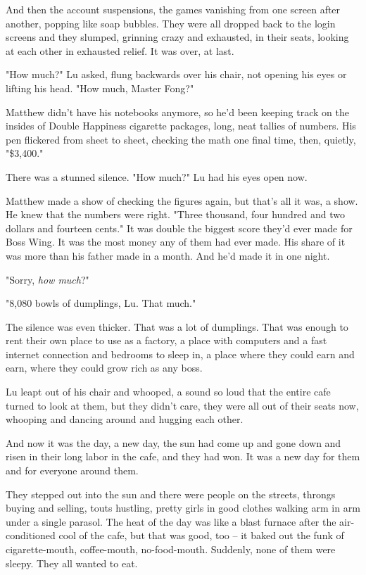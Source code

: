 And then the account suspensions, the games vanishing from one
screen after another, popping like soap bubbles. They were all
dropped back to the login screens and they slumped, grinning crazy
and exhausted, in their seats, looking at each other in exhausted
relief. It was over, at last.

"How much?" Lu asked, flung backwards over his chair, not opening
his eyes or lifting his head. "How much, Master Fong?"

Matthew didn't have his notebooks anymore, so he'd been keeping
track on the insides of Double Happiness cigarette packages, long,
neat tallies of numbers. His pen flickered from sheet to sheet,
checking the math one final time, then, quietly, "\$3,400."

There was a stunned silence. "How much?" Lu had his eyes open now.

Matthew made a show of checking the figures again, but that's all
it was, a show. He knew that the numbers were right. "Three
thousand, four hundred and two dollars and fourteen cents." It was
double the biggest score they'd ever made for Boss Wing. It was the
most money any of them had ever made. His share of it was more than
his father made in a month. And he'd made it in one night.

"Sorry, \emph{how much}?"

"8,080 bowls of dumplings, Lu. That much."

The silence was even thicker. That was a lot of dumplings. That was
enough to rent their own place to use as a factory, a place with
computers and a fast internet connection and bedrooms to sleep in,
a place where they could earn and earn, where they could grow rich
as any boss.

Lu leapt out of his chair and whooped, a sound so loud that the
entire cafe turned to look at them, but they didn't care, they were
all out of their seats now, whooping and dancing around and hugging
each other.

And now it was the day, a new day, the sun had come up and gone
down and risen in their long labor in the cafe, and they had won.
It was a new day for them and for everyone around them.

They stepped out into the sun and there were people on the streets,
throngs buying and selling, touts hustling, pretty girls in good
clothes walking arm in arm under a single parasol. The heat of the
day was like a blast furnace after the air-conditioned cool of the
cafe, but that was good, too -- it baked out the funk of
cigarette-mouth, coffee-mouth, no-food-mouth. Suddenly, none of
them were sleepy. They all wanted to eat.

